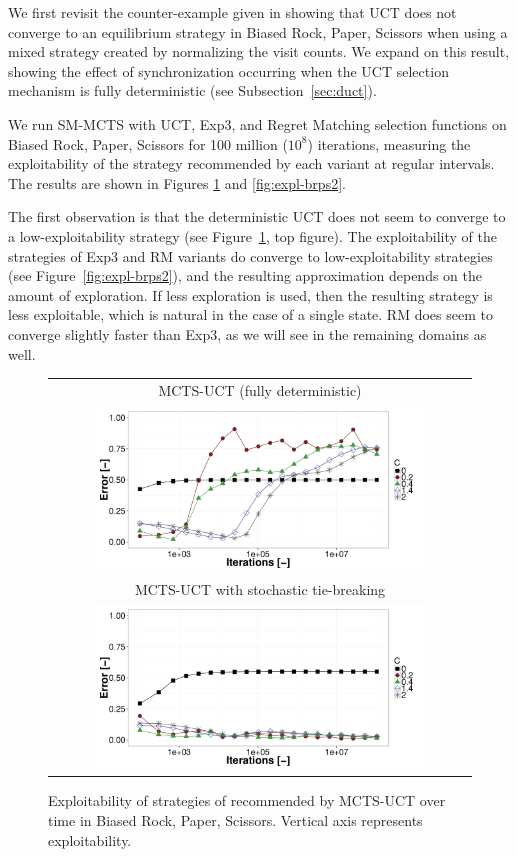 We first revisit the counter-example given in \cite{Shafiei09} showing that
UCT does not converge to an equilibrium strategy in Biased Rock, Paper, Scissors
when using a mixed strategy created by normalizing the visit counts.
We expand on this result, showing the effect of synchronization occurring when the UCT selection mechanism is fully deterministic (see Subsection~\ref{sec:duct}).

We run SM-MCTS with UCT, Exp3, and Regret Matching selection functions on Biased Rock, Paper, Scissors
for 100 million ($10^8$) iterations, measuring the exploitability of the strategy recommended by
each variant at regular intervals. The results are shown in Figures \ref{fig:expl-brps1} and \ref{fig:expl-brps2}.

The first observation is that the deterministic UCT does not seem to converge to a low-exploitability strategy (see Figure~\ref{fig:expl-brps1}, top figure). The exploitability of the strategies of
Exp3 and RM variants do converge to low-exploitability strategies (see Figure~\ref{fig:expl-brps2}), and the resulting approximation depends on the amount of exploration.
If less exploration is used, then the resulting strategy is less exploitable, which is natural in the case of a single state. RM does seem to
converge slightly faster than Exp3, as we will see in the remaining domains as well.

\begin{figure}[t!]
\centering
\begin{tabular}{c}
{\small MCTS-UCT (fully deterministic)} \\
\includegraphics[width=0.8\textwidth]{figures/brps-MCTS-UCT.pdf} \\
{\small MCTS-UCT with stochastic tie-breaking} \\
\includegraphics[width=0.8\textwidth]{figures/brps-MCTS-UCT-NONDET.pdf} \\
\end{tabular}
\caption{Exploitability of strategies of recommended by MCTS-UCT over time in Biased Rock, Paper, Scissors. Vertical axis represents exploitability. }
\label{fig:expl-brps1}
\end{figure}

